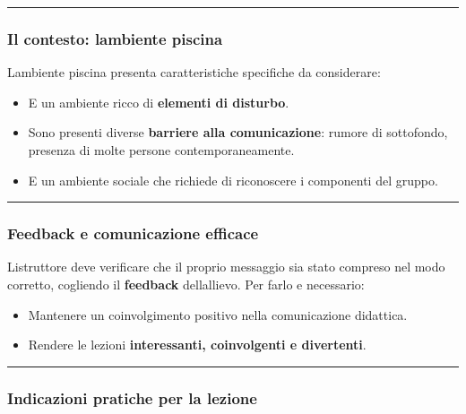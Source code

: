 \documentclass[a4paper,11pt]{article}
\providecommand{\tightlist}{%
  \setlength{\itemsep}{0pt}\setlength{\parskip}{0pt}}
\begin{document}
\begin{center}\rule{0.5\linewidth}{0.5pt}\end{center}

\subsubsection{Il contesto: l\textquotesingle ambiente
      piscina}\label{il-contesto-lambiente-piscina}

L\textquotesingle ambiente piscina presenta caratteristiche specifiche
da considerare:

\begin{itemize}
      \tightlist
      \item
            E un ambiente ricco di \textbf{elementi di disturbo}.
      \item
            Sono presenti diverse \textbf{barriere alla comunicazione}: rumore di
            sottofondo, presenza di molte persone contemporaneamente.
      \item
            E un ambiente sociale che richiede di riconoscere i componenti del
            gruppo.
\end{itemize}

\begin{center}\rule{0.5\linewidth}{0.5pt}\end{center}

\subsubsection{Feedback e comunicazione
      efficace}\label{feedback-e-comunicazione-efficace}

L\textquotesingle istruttore deve verificare che il proprio messaggio
sia stato compreso nel modo corretto, cogliendo il \textbf{feedback}
dell\textquotesingle allievo. Per farlo e necessario:

\begin{itemize}
      \tightlist
      \item
            Mantenere un coinvolgimento positivo nella comunicazione didattica.
      \item
            Rendere le lezioni \textbf{interessanti, coinvolgenti e divertenti}.
\end{itemize}

\begin{center}\rule{0.5\linewidth}{0.5pt}\end{center}

\subsubsection{Indicazioni pratiche per la
      lezione}\label{indicazioni-pratiche-per-la-lezione}
\end{document}
